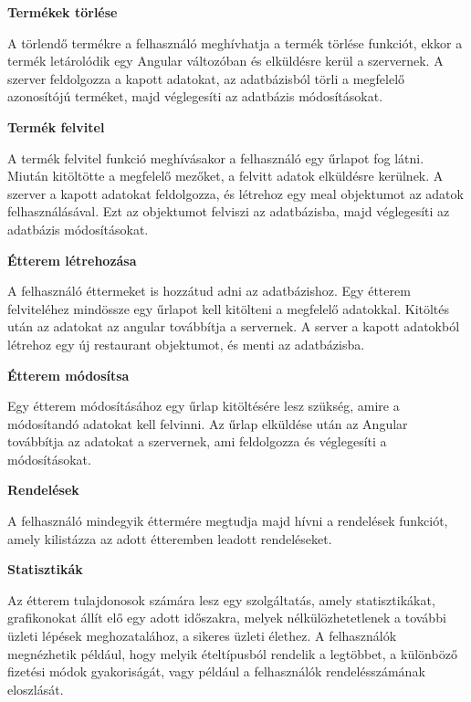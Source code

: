 \bigskip

\noindent \textbf{Termékek törlése}

\bigskip

A törlendő termékre a felhasználó meghívhatja a termék törlése funkciót, ekkor a termék letárolódik egy Angular változóban és elküldésre kerül a szervernek. A szerver feldolgozza a kapott adatokat, az adatbázisból törli a megfelelő azonosítójú terméket, majd véglegesíti az adatbázis módosításokat.

\bigskip

\noindent \textbf{Termék felvitel}

\bigskip

A termék felvitel funkció meghívásakor a felhasználó egy űrlapot fog látni. Miután kitöltötte a megfelelő mezőket, a felvitt adatok elküldésre kerülnek. A szerver a kapott adatokat feldolgozza, és létrehoz egy meal objektumot az adatok felhasználásával. Ezt az objektumot felviszi az adatbázisba, majd véglegesíti az adatbázis módosításokat.

\bigskip

\noindent \textbf{Étterem létrehozása}

\bigskip

A felhasználó éttermeket is hozzátud adni az adatbázishoz. Egy étterem felviteléhez mindössze egy űrlapot kell kitölteni a megfelelő adatokkal. Kitöltés után az adatokat az angular továbbítja a servernek. A server a kapott adatokból létrehoz egy új restaurant objektumot, és menti az adatbázisba.

\bigskip

\noindent \textbf{Étterem módosítsa}

\bigskip

Egy étterem módosításához egy űrlap kitöltésére lesz szükség, amire a módosítandó adatokat kell felvinni. Az űrlap elküldése után az Angular továbbítja az adatokat a szervernek, ami feldolgozza és véglegesíti a módosításokat.

\bigskip

\noindent \textbf{Rendelések}

\bigskip

A felhasználó mindegyik éttermére megtudja majd hívni a rendelések funkciót, amely kilistázza az adott étteremben leadott rendeléseket.

\newpage

\noindent \textbf{Statisztikák}

\bigskip

Az étterem tulajdonosok számára lesz egy szolgáltatás, amely statisztikákat, grafikonokat állít elő egy adott időszakra, melyek nélkülözhetetlenek a további üzleti lépések meghozatalához, a sikeres üzleti élethez. A felhasználók megnézhetik például, hogy melyik ételtípusból rendelik a legtöbbet, a különböző fizetési módok gyakoriságát, vagy például a felhasználók rendelésszámának eloszlását.

